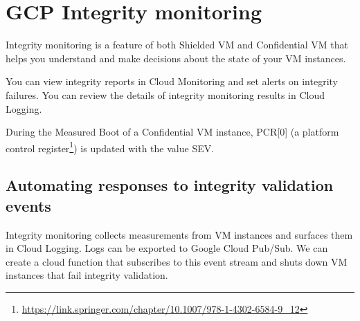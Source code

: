 
\section*{GCP Integrity monitoring}

Integrity monitoring is a feature of both Shielded VM 
and Confidential VM that helps you understand 
and make decisions about the state of your VM instances.

You can view integrity reports in Cloud Monitoring 
and set alerts on integrity failures. 
You can review the details of integrity monitoring results in Cloud Logging.

During the Measured Boot of a Confidential VM instance, 
PCR[0] (a platform control register\footnote{\url{https://link.springer.com/chapter/10.1007/978-1-4302-6584-9_12}}) 
is updated with the value SEV.

\subsection*{Automating responses to integrity validation events}
Integrity monitoring collects measurements from VM instances 
and surfaces them in Cloud Logging. 
Logs can be exported to Google Cloud Pub/Sub. 
We can create a cloud function that subscribes to this event stream 
and shuts down VM instances that fail integrity validation.

